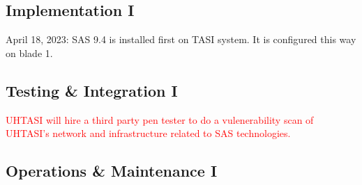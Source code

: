 \subsection{Implementation I}

April 18, 2023:
SAS 9.4 is installed first on TASI system. It is configured this way on blade 1. 


\subsection{Testing \& Integration I}

\textcolor{red}{UHTASI will hire a third party pen tester to do a vulenerability scan of UHTASI's network and infrastructure related to SAS technologies.}


\subsection{Operations \& Maintenance I}